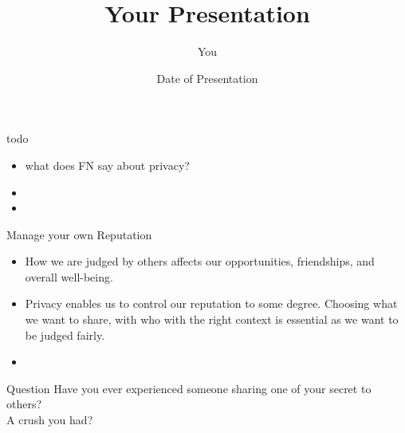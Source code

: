 \documentclass{beamer}
\title[Your Short Title]{Your Presentation}
\author{You}
\institute{Where You're From}
\date{Date of Presentation}
\begin{document}
\begin{frame}
  \titlepage
\end{frame}




%



\begin{frame}{todo}
\begin{itemize}
  \item what does FN say about privacy?
  \item
  \item
\end{itemize}
\end{frame}


\begin{frame}{Manage your own Reputation}
\begin{itemize}
  \item How we are judged by others affects our opportunities, friendships, and overall well-being.
  \item Privacy enables us to control our reputation to some degree. Choosing what we want to share, with who with the right context is essential as we want to be judged fairly.
  \item
\end{itemize}
\begin{block}{Question}
Have you ever experienced someone sharing one of your secret to others? \\
A crush you had?
\end{block}
\end{frame}
\end{document}
